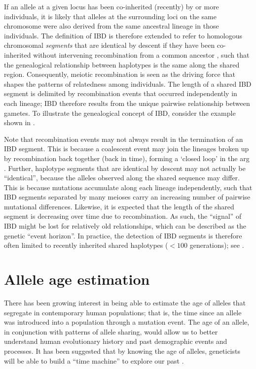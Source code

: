 %

%

If an allele at a given locus has been co-inherited (recently) by  or more individuals, it is likely that alleles at the surrounding loci on the same chromosome were also derived from the same ancestral lineage in those individuals.
The definition of IBD is therefore extended to refer to homologous chromosomal \emph{segments} that are identical by descent if they have been co-inherited without intervening recombination from a common ancestor \citep{Hayes:2003gj,Powell:2010di}, such that the genealogical relationship between  haplotypes is the same along the shared region.
Consequently, meiotic recombination is seen as the driving force that shapes the patterns of relatedness among individuals.
The length of a shared IBD segment is delimited by recombination events that occurred independently in each lineage; IBD therefore results from the unique pairwise relationship between  gametes.
To illustrate the genealogical concept of IBD, consider the example shown in .

Note that recombination events may not always result in the termination of an IBD segment.
This is because a coalescent event may join the  lineages broken up by recombination back together (back in time), forming a `closed loop' in the \gls{arg} \citep[see][Theorem~2.4]{griffiths1997ancestral}.
Further, haplotype segments that are identical by descent may not actually be ``identical'', because the alleles observed along the shared sequence may differ.
This is because mutations accumulate along each lineage independently, such that IBD segments separated by many meioses carry an increasing number of pairwise mutational differences.
Likewise, it is expected that the length of the shared segment is decreasing over time due to recombination.
As such, the ``signal'' of IBD might be lost for relatively old relationships, which can be described as the genetic ``event horizon''.
In practice, the detection of IBD segments is therefore often limited to recently inherited shared haplotypes (\eg $<100$ generations); see \citet{Browning:2008es}.



%
\section{Allele age estimation}
\label{sec:alleleage}
%

There has been growing interest in being able to estimate the age of alleles that segregate in contemporary human populations; that is, the time since an allele was introduced into a population through a mutation event.
The age of an allele, in conjunction with patterns of allele sharing, would allow us to better understand human evolutionary history and past demographic events and processes.
It has been suggested that by knowing the age of alleles, geneticists will be able to build a ``time machine'' to explore our past \citep{Slatkin:2000us}.

